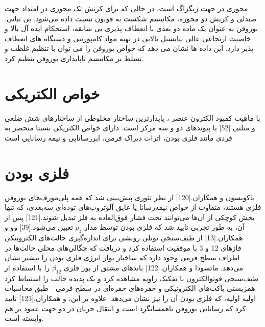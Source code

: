 محوری در جهت زیگزاگ است، در حالی که برای کرنش تک محوری در امتداد جهت صندلی و کرنش دو محوره، مکانیسم شکست به فونون نسبت داده می‌شود. بی ثباتی. بوروفن به عنوان یک ماده دو بعدی با انعطاف پذیری بی سابقه، استحکام ایده آل بالا و خاصیت ارتجاعی عالی پتانسیل بالایی در تهیه مواد کامپوزیتی و دستگاه های انعطاف پذیر دارد. این داده ها نشان می دهد که خواص بوروفن را می توان با تنظیم غلظت  و تسلط بر مکانیسم ناپایداری بوروفن تنظیم کرد.

\section{خواص الکتریکی}
با ماهیت کمبود الکترون عنصر ، پایدارترین ساختار مخلوطی از ساختارهای شش ضلعی و مثلثی [52] با پیوندهای دو و سه مرکز است. دارای خواص الکتریکی نسبتا منحصر به فردی مانند فلزی بودن، اثرات دیراک فرمی، ابررسانایی و نیمه رسانایی است
\section{فلزی بودن}
یاکوبسون و همکاران.[120] از نظر تئوری پیش‌بینی شد که همه پلی‌مورف‌های بوروفن فلزی هستند، متفاوت از خواص نیمه‌رسانا یا عایق آلوتروپ‌های توده‌ای سه‌بعدی، که تنها بخش کوچکی از آن‌ها می‌توانند تحت فشار فوق‌العاده به فلز تبدیل شوند.[121] پس از آن، به طور تجربی تایید شد که فلزی بودن توسط مدار $p_z$ تعیین می‌شود.[39] وو و همکاران.[13] از طیف‌سنجی تونلی روبشی برای اندازه‌گیری حالت‌های الکترونیکی فازهای 12 و 3 با موفقیت استفاده کرد و دریافت که چگالی‌های محلی حالت‌ها در اطراف سطح فرمی وجود دارد که ساختار نوار انرژی فلزی بودن را بیشتر نشان می‌دهد. ماتسودا و همکاران.[122] باندهای مشتق از بور فلزی $\beta_{12}$ را با استفاده از طیف‌سنجی فوتوالکترون با تفکیک زاویه مشاهده کرد و یک پدیده جالب را استنباط کرد - همزیستی پاکت‌های الکترونیکی و حفره‌های حفره‌ای در سطح فرمی - طبق محاسبات اولیه اولیه، که فلزی بودن آن را نیز نشان می‌دهد. علاوه بر این،  و همکاران.[123] تایید کرد که رسانایی بوروفن ناهمسانگرد است و انتقال جریان در دو جهت عمود بر هم وابسته است.
